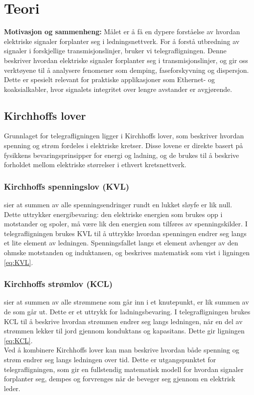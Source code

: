 
\section{Teori}

    \textbf{Motivasjon og sammenheng:} Målet er å få en dypere forståelse av hvordan elektriske signaler forplanter seg i ledningsnettverk. For å forstå utbredning av signaler i forskjellige transmisjonslinjer, bruker vi telegrafligningen. Denne beskriver hvordan elektriske signaler forplanter seg i transmisjonslinjer, og gir oss verktøyene til å analysere fenomener som demping, faseforskyvning og dispersjon. Dette er spesielt relevant for praktiske applikasjoner som Ethernet- og koaksialkabler, hvor signalets integritet over lengre avstander er avgjørende.

\subsection{Kirchhoffs lover}
Grunnlaget for telegrafligningen ligger i Kirchhoffs lover, som beskriver hvordan spenning og strøm 
fordeles i elektriske kretser. Disse lovene er direkte basert på fysikkens bevaringsprinsipper 
for energi og ladning, og de brukes til å beskrive forholdet mellom elektriske størrelser i ethvert 
kretsnettverk.
\subsubsection{Kirchhoffs spenningslov (KVL)} sier at summen av alle spenningsendringer rundt en lukket 
sløyfe er lik null. Dette uttrykker energibevaring: den elektriske energien som brukes opp i motstander 
og spoler, må være lik den energien som tilføres av spenningskilder. I telegrafligningen brukes KVL 
til å uttrykke hvordan spenningen endrer seg langs et lite element av ledningen. Spenningsfallet 
langs et element avhenger av den ohmske motstanden og induktansen, og beskrives matematisk som vist i ligningen \eqref{eq:KVL}.
\subsubsection{Kirchhoffs strømlov (KCL)} sier at summen av alle strømmene som går inn i et knutepunkt, 
er lik summen av de som går ut. Dette er et uttrykk for ladningsbevaring. I telegrafligningen brukes 
KCL til å beskrive hvordan strømmen endrer seg langs ledningen, når en del av strømmen lekker til jord 
gjennom konduktans og kapasitans. Dette gir ligningen \eqref{eq:KCL}.\\[1em]
Ved å kombinere Kirchhoffs lover kan man beskrive hvordan både spenning og strøm endrer seg 
langs ledningen over tid. Dette er utgangspunktet for telegrafligningen, som gir 
en fullstendig matematisk modell for hvordan signaler forplanter seg, dempes og forvrenges når de beveger 
seg gjennom en elektrisk leder.
\clearpage
